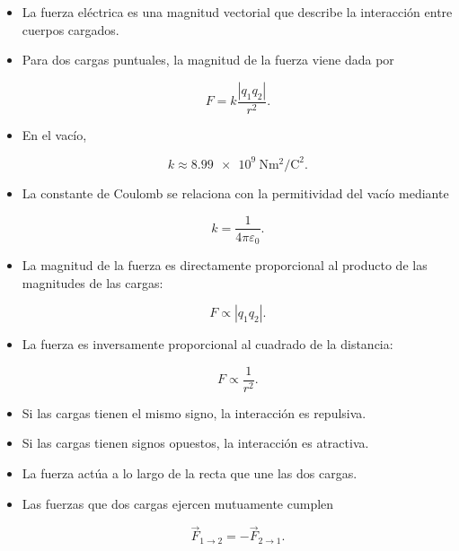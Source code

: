 
\begin{resumen}

\begin{itemize}

    \item La fuerza eléctrica es una magnitud vectorial que describe la
    interacción entre cuerpos cargados.

    \item Para dos cargas puntuales, la magnitud de la fuerza viene dada por

    \[
    \boxed{
    F
    =
    k\frac{|q_1q_2|}{r^2}
    }.
    \]

    \item En el vacío,

    \[
    \boxed{
    k
    \approx
    \SI{8.99e9}{\newton\metre\squared\per\coulomb\squared}
    }.
    \]

    \item La constante de Coulomb se relaciona con la permitividad del vacío
    mediante

    \[
    \boxed{
    k
    =
    \frac{1}{4\pi\varepsilon_0}
    }.
    \]

    \item La magnitud de la fuerza es directamente proporcional al producto
    de las magnitudes de las cargas:

    \[
    F\propto|q_1q_2|.
    \]

    \item La fuerza es inversamente proporcional al cuadrado de la distancia:

    \[
    F\propto\frac{1}{r^2}.
    \]

    \item Si las cargas tienen el mismo signo, la interacción es repulsiva.

    \item Si las cargas tienen signos opuestos, la interacción es atractiva.

    \item La fuerza actúa a lo largo de la recta que une las dos cargas.

    \item Las fuerzas que dos cargas ejercen mutuamente cumplen

    \[
    \boxed{
    \vec{F}_{1\to2}
    =
    -\vec{F}_{2\to1}
    }.
    \]


\end{itemize}
\end{resumen}
